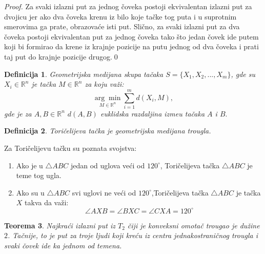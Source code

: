\documentclass[11pt]{article}
\newtheorem{teo}{\bf Teorema}[section]
\newtheorem{df}[teo]{\bf Definicija}
\begin{document}
\begin{proof}
Za svaki izlazni put za jednog \v coveka postoji ekvivalentan izlazni put za dvojicu jer ako dva \v coveka krenu iz bilo koje ta\v cke tog puta i u suprotnim smerovima ga prate, obrazova\' ce isti put. Sli\v cno, za svaki izlazni put za dva \v coveka postoji ekvivalentan put za jednog \v coveka tako \v sto jedan \v covek ide putem koji bi formirao da krene iz krajnje pozicije na putu jednog od dva \v coveka i prati taj put do krajnje pozicije drugog.\qed
\end{proof}
\begin{df} Geometrijska medijana skupa ta\v caka $S=\{ X_1, X_2, ..., X_m\}$, gde su $X_i\in \mathbb{R}^n$ je ta\v cka $M\in \mathbb{R}^n$ za koju va\v zi:
$$\underset{M\in \mathbb{R}^n}{\arg\min} \sum^m_{i=1}{d(X_i, M)}, $$
gde je za $A,B\in \mathbb{R}^n$ $d(A, B)$ euklidska razdaljina izme\dj u ta\v caka $A$ i $B.$\end{df}
\begin{df} Tori\v celijeva ta\v cka je geometrijska medijana trougla. \end{df}
\indent Za Tori\v celijevu ta\v cku su poznata svojstva:
\begin{enumerate}
\item Ako je u $\bigtriangleup ABC$ jedan od uglova ve\' ci od $120^\circ$, Tori\v celijeva ta\v cka $\bigtriangleup ABC$ je teme tog ugla.
\item Ako su u $\bigtriangleup ABC$ svi uglovi ne ve\' ci od $120^\circ$,Tori\v celijeva ta\v cka $\bigtriangleup ABC$ je ta\v cka $X$ takva da va\v zi:
$$\angle AXB=\angle BXC= \angle CXA=120^\circ$$
\end{enumerate}


\begin{teo} Najkra\' ci izlazni put iz $T_2$ \v ciji je konveksni omota\v c trougao je du\v zine $2$. Ta\v cnije, to je put za troje ljudi koji kre\' cu iz centra jednakostrani\v cnog trougla i svaki \v covek ide ka jednom od temena.
\end{teo}
\end{document}
